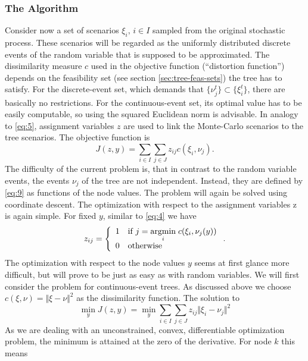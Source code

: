 \subsubsection{The Algorithm}
\label{sec:k-means-for-trees-alg}
Consider now a set of scenarios $\xi_i,\, i\in I$ sampled from the original stochastic process.
These scenarios will be regarded as the uniformly distributed discrete events of the random variable that is supposed to be approximated. 
The dissimilarity measure $c$ used in the objective function (``distortion function'') depends on the feasibility set (see section \ref{sec:tree-feas-sets}) the tree has to satisfy.
For the discrete-event set, which demands that $\{\nu_j^t\}\subset\{\xi_i^t\}$, there are basically no restrictions.
For the continuous-event set, its optimal value has to be easily computable, so using the squared Euclidean norm is advisable.
In analogy to \eqref{eq:5}, assignment variables $z$ are used to link the Monte-Carlo scenarios to the tree scenarios.
The objective function is
\begin{equation}
  \label{eq:8}
  J(z, y) = \sum_{i\in I}\sum_{j\in J}z_{ij}c(\xi_i, \nu_j).
\end{equation}
The difficulty of the current problem is, that in contrast to the random variable events, the events $\nu_j$ of the tree are not independent.
Instead, they are defined by \eqref{eq:9} as functions of the node values.
The problem will again be solved using coordinate descent.
The optimization with respect to the assignment variables z is again simple. For fixed $y$, similar to \eqref{eq:4} we have
\begin{equation}
  \label{eq:10}
  z_{ij} = \left\{\begin{array}{ll}1&\text{if }j=\underset{i}{\operatorname{argmin}}\; c(\xi_i,\nu_j(y))\\0&\text{otherwise} \end{array}\right. .  
\end{equation}
The optimization with respect to the node values $y$ seems at first glance more difficult, but will prove to be just as easy as with random variables. We will first consider the problem for continuous-event trees. As discussed above we choose $c(\xi, \nu) = \Vert \xi-\nu\Vert^2$ as the dissimilarity function. The solution to
\begin{equation}
  \label{eq:11}
  \min\limits_y J(z,y) = \min\limits_y \sum_{i\in I}\sum_{j\in J}z_{ij}\Vert \xi_i - \nu_j\Vert^2
\end{equation}
As we are dealing with an unconstrained, convex, differentiable optimization problem, the minimum is attained at the zero of the derivative. For node $k$ this means
